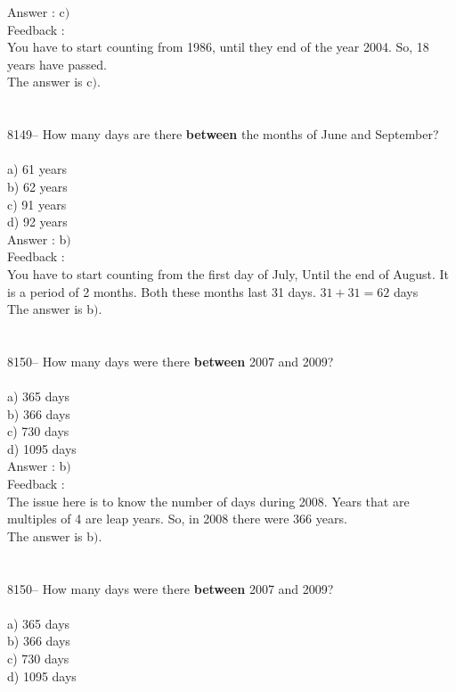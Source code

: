 \documentclass[letterpaper, 12pt]{article}
\begin{document}
Answer : c$)$\\

Feedback :\\
You have to start counting from 1986, until they end of the year 2004. So, 18 years have passed. \\
The answer is c$)$.\\
\\
\\
8149-- How many days are there \textbf{between} the months of June and September?\\
\\
a) 61 years\\
b) 62 years\\
c) 91 years\\
d) 92 years\\

Answer : b$)$\\

Feedback :\\
You have to start counting from the first day of July, Until the end of August. It is a period of 2 months. Both these months last 31 days. $31+31=62$ days \\
The answer is b$)$.\\
\\
\\
8150-- How many days were there \textbf{between} 2007 and 2009?\\
\\
a) 365 days\\
b) 366 days\\
c) 730 days\\
d) 1095 days\\

Answer : b$)$\\

Feedback :\\
The issue here is to know the number of days during 2008. Years that are multiples of 4 are leap years. So, in 2008 there were 366 years. \\
The answer is b$)$.\\
\\
\\
8150-- How many days were there \textbf{between} 2007 and 2009?\\
\\
a) 365 days\\
b) 366 days\\
c) 730 days\\
d) 1095 days\\
\end{document}
